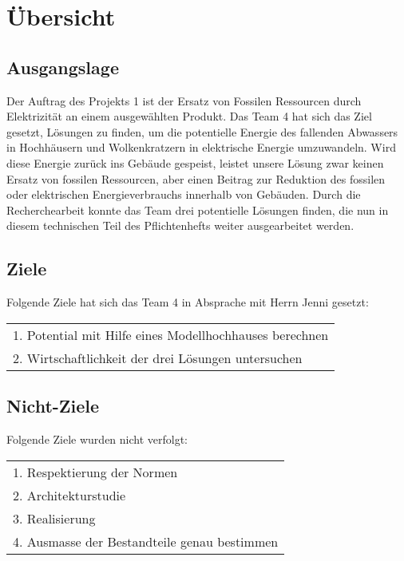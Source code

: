 \section{Übersicht} \label{sec:uebersicht}
\subsection{Ausgangslage}
Der Auftrag des Projekts 1 ist der Ersatz von Fossilen Ressourcen durch Elektrizität an einem ausgewählten Produkt. Das Team 4 hat sich das Ziel gesetzt, Lösungen zu finden, um die potentielle Energie des fallenden Abwassers in Hochhäusern und Wolkenkratzern in elektrische Energie umzuwandeln. Wird diese Energie zurück ins Gebäude gespeist, leistet unsere Lösung zwar keinen Ersatz von fossilen Ressourcen, aber einen Beitrag zur Reduktion des fossilen oder elektrischen Energieverbrauchs innerhalb von Gebäuden.
Durch die Recherchearbeit konnte das Team drei potentielle Lösungen finden, die nun in diesem technischen Teil des Pflichtenhefts weiter ausgearbeitet werden.

\subsection{Ziele}
Folgende Ziele hat sich das Team 4 in Absprache mit Herrn Jenni gesetzt:
\begin{table}[H]
\begin{tabular}{l}
1. Potential mit Hilfe eines Modellhochhauses berechnen\\
2. Wirtschaftlichkeit der drei Lösungen untersuchen\\
\end{tabular}
\end{table}

\subsection{Nicht-Ziele}
Folgende Ziele wurden nicht verfolgt:
\begin{table}[H]
\begin{tabular}{l}
1. Respektierung der Normen\\
2. Architekturstudie\\
3. Realisierung\\
4. Ausmasse der Bestandteile genau bestimmen\\
\end{tabular}
\end{table}
